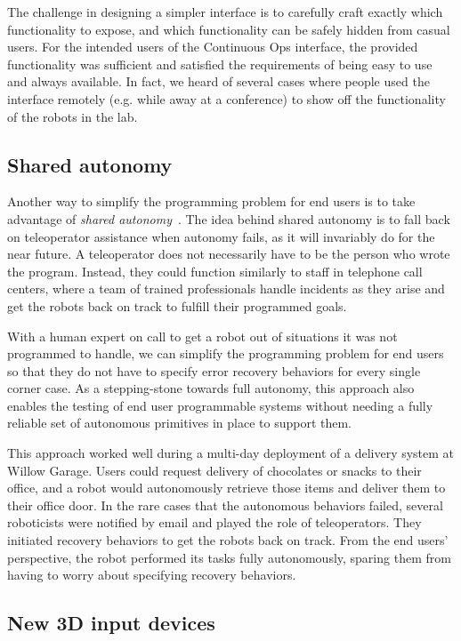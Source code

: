 \documentclass[10pt,twocolumn]{article}
\begin{document}
The challenge in designing a simpler interface is to carefully craft exactly which functionality to expose, and which functionality can be safely hidden from casual users.  For the intended users of the Continuous Ops interface, the provided functionality was sufficient and satisfied the requirements of being easy to use and always available. In fact, we heard of several cases where people used the interface remotely (e.g. while away at a conference) to show off the functionality of the robots in the lab.

\subsection{Shared autonomy}

Another way to simplify the programming problem for end users is to take advantage of {\em shared autonomy}~\cite{leeper-hri12,pitzer-icra11}. The idea behind shared autonomy is to fall back on teleoperator assistance when autonomy fails, as it will invariably do for the near future. A teleoperator does not necessarily have to be the person who wrote the program. Instead, they could function similarly to staff in telephone call centers, where a team of trained professionals handle incidents as they arise and get the robots back on track to fulfill their programmed goals.

With a human expert on call to get a robot out of situations it was not programmed to handle, we can simplify the programming problem for end users so that they do not have to specify error recovery behaviors for every single corner case. As a stepping-stone towards full autonomy, this approach also enables the testing of end user programmable systems without needing a fully reliable set of autonomous primitives in place to support them.

This approach worked well during a multi-day deployment of a delivery system at Willow Garage. Users could request delivery of chocolates or snacks to their office, and a robot would autonomously retrieve those items and deliver them to their office door. In the rare cases that the autonomous behaviors failed, several roboticists were notified by email and played the role of teleoperators. They initiated recovery behaviors to get the robots back on track. From the end users' perspective, the robot performed its tasks fully autonomously, sparing them from having to worry about specifying recovery behaviors.

\subsection{New 3D input devices}
\end{document}
